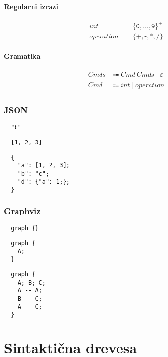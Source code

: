 \documentclass{report}
\newcommand{\Null}{\varepsilon}
\newcommand{\Char}[1]{\texttt{#1}}
\newcommand{\Spc}{\ }
\newcommand{\Union}{\mathrel{|}}
\newcommand{\KleenePlus}[1]{#1^+}
\newcommand{\Arrow}{\Coloneq}
\newcommand{\NT}[1]{{#1}}
\newcommand{\T}[1]{{#1}}
\begin{document}
\subsubsection*{Regularni izrazi}
\begin{equation*}
  \begin{aligned}
    \T{int} &= \KleenePlus{\{\Char{0}, \dots, \Char{9}\}}\\
    \T{operation} &= \{\Char{+}, \Char{-}, \Char{*}, \Char{/}\}
  \end{aligned}
\end{equation*}

\subsubsection*{Gramatika}
\begin{equation*}
  \begin{aligned}
    \NT{Cmds} &\Arrow \NT{Cmd} \Spc \NT{Cmds} \Union \Null \\
    \NT{Cmd} &\Arrow \T{int} \Union \T{operation}\\
  \end{aligned}
\end{equation*}

\subsection{JSON}
\begin{verbatim}
  "b"
\end{verbatim}
\begin{verbatim}
  [1, 2, 3]
\end{verbatim}
\begin{verbatim}
  {
    "a": [1, 2, 3];
    "b": "c";
    "d": {"a": 1;};
  }
\end{verbatim}

\subsection{Graphviz}
\begin{verbatim}
  graph {}
\end{verbatim}
\begin{verbatim}
  graph {
    A;
  }
\end{verbatim}
\begin{verbatim}
  graph {
    A; B; C;
    A -- A;
    B -- C;
    A -- C;
  }
\end{verbatim}

\chapter{Sintaktična drevesa}
\end{document}
